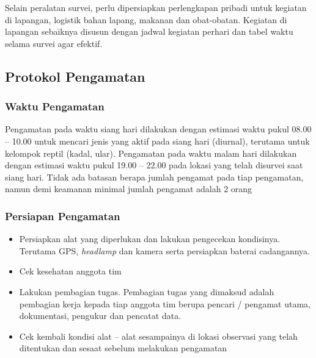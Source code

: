 \documentclass[
]{book}
\providecommand{\tightlist}{%
  \setlength{\itemsep}{0pt}\setlength{\parskip}{0pt}}
\begin{document}
Selain peralatan survei, perlu dipersiapkan perlengkapan pribadi untuk kegiatan di lapangan, logistik bahan lapang, makanan dan obat-obatan. Kegiatan di lapangan sebaiknya disusun dengan jadwal kegiatan perhari dan tabel waktu selama survei agar efektif.

\hypertarget{protokol-pengamatan-1}{%
\subsection*{Protokol Pengamatan}\label{protokol-pengamatan-1}}

\hypertarget{waktu-pengamatan}{%
\subsubsection*{Waktu Pengamatan}\label{waktu-pengamatan}}

Pengamatan pada waktu siang hari dilakukan dengan estimasi waktu pukul 08.00 -- 10.00 untuk mencari jenis yang aktif pada siang hari (diurnal), terutama untuk kelompok reptil (kadal, ular). Pengamatan pada waktu malam hari dilakukan dengan estimasi waktu pukul 19.00 -- 22.00 pada lokasi yang telah disurvei saat siang hari. Tidak ada batasan berapa jumlah pengamat pada tiap pengamatan, namun demi keamanan minimal jumlah pengamat adalah 2 orang

\hypertarget{persiapan-pengamatan}{%
\subsubsection*{Persiapan Pengamatan}\label{persiapan-pengamatan}}

\begin{itemize}
\tightlist
\item
  Persiapkan alat yang diperlukan dan lakukan pengecekan kondisinya. Terutama GPS, \emph{headlamp} dan kamera serta persiapkan baterai cadangannya.
\item
  Cek kesehatan anggota tim
\item
  Lakukan pembagian tugas. Pembagian tugas yang dimaksud adalah pembagian kerja kepada tiap anggota tim berupa pencari / pengamat utama, dokumentasi, pengukur dan pencatat data.
\item
  Cek kembali kondisi alat -- alat sesampainya di lokasi observasi yang telah ditentukan dan sesaat sebelum melakukan pengamatan
\end{itemize}
\end{document}
